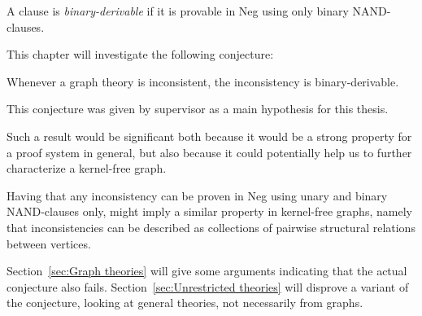 

\begin{definition}
  A clause is \textit{binary-derivable} if it is provable in Neg using only binary NAND-clauses.
\end{definition}
This chapter will investigate the following conjecture:
\begin{conjecture}
  Whenever a graph theory is inconsistent, the inconsistency is binary-derivable.
\end{conjecture}
This conjecture was given by supervisor as a main hypothesis for this thesis.

Such a result would be significant both because it would be a strong property for a proof system in general, but also because it could potentially help us to further characterize a kernel-free graph.

Having that any inconsistency can be proven in Neg using unary and binary NAND-clauses only, might imply a similar property in kernel-free graphs, namely that inconsistencies can be described as collections of pairwise structural relations between vertices.

Section~\ref{sec:Graph theories} will give some arguments indicating that the actual conjecture also fails.
Section~\ref{sec:Unrestricted theories} will disprove a variant of the conjecture, looking at general theories, not necessarily from graphs.
